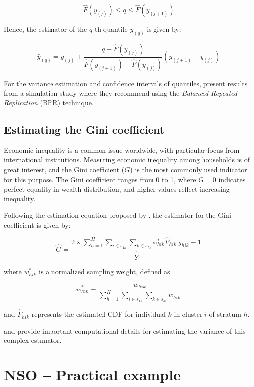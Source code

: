\documentclass[
  12pt,
]{book}
\begin{document}
\[
\widehat{F}(y_{(j)}) \leq q\leq\widehat{F}(y_{(j+1)})
\]

Hence, the estimator of the \(q\)-th quantile \(y_{(q)}\) is given by:

\[
\widehat{y}_{(q)} = y_{(j)} + \frac{q - \widehat{F}(y_{(j)})}{\widehat{F}(y_{(j+1)}) - \widehat{F}(y_{(j)})} (y_{(j+1)} - y_{(j)})
\]

For the variance estimation and confidence intervals of quantiles, \citet{kovar1988bootstrap} present results from a simulation study where they recommend using the \emph{Balanced Repeated Replication} (BRR) technique.

\hypertarget{estimating-the-gini-coefficient}{%
\subsection{Estimating the Gini coefficient}\label{estimating-the-gini-coefficient}}

Economic inequality is a common issue worldwide, with particular focus from international institutions. Measuring economic inequality among households is of great interest, and the Gini coefficient (\(G\)) is the most commonly used indicator for this purpose. The Gini coefficient ranges from 0 to 1, where \(G = 0\) indicates perfect equality in wealth distribution, and higher values reflect increasing inequality.

Following the estimation equation proposed by \citet{binder1995estimating}, the estimator for the Gini coefficient is given by:

\[
\widehat{G} = \frac {2 \times \sum_{h=1}^{H} \sum_{i \in s_{1h}} \sum_{k \in s_{hi}}  w_{hik}^{*} \widehat{F}_{hik} \ y_{hik} - 1} {\widehat{\overline{Y}}}
\]

where \(w_{hik}^{*}\) is a normalized sampling weight, defined as

\[
w_{hik}^{*} = \frac{w_{hik}} {\sum_{h=1}^{H} \sum_{i \in s_{1h}}  \sum_{k \in s_{hi}} w_{hik}}
\]

and \(\widehat{F}_{hik}\) represents the estimated CDF for individual \(k\) in cluster \(i\) of stratum \(h\).

\citet{osier2009variance} and \citet{Langel_Tille_2013} provide important computational details for estimating the variance of this complex estimator.

\hypertarget{nso-practical-example}{%
\section{NSO -- Practical example}\label{nso-practical-example}}
\end{document}

